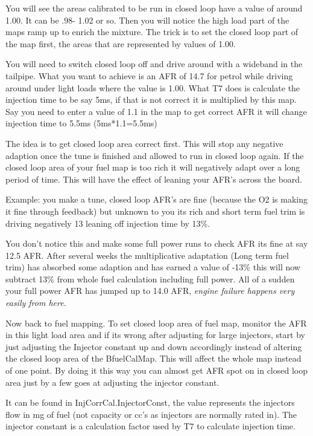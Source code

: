 \documentclass[11pt,a4paper]{book}
\begin{document}
You will see the areas calibrated to be run in closed loop have a value of around 1.00. It can be .98-
1.02 or so. Then you will notice the high load part of the maps ramp up to enrich the mixture.
The trick is to set the closed loop part of the map first, the areas that are represented by values of
1.00.

You will need to switch closed loop off and drive around with a wideband in the tailpipe.
What you want to achieve is an AFR of 14.7 for petrol while driving around under light loads where
the value is 1.00. What T7 does is calculate the injection time to be say 5ms, if that is not correct it is
multiplied by this map. Say you need to enter a value of 1.1 in the map to get correct AFR it will
change injection time to 5.5ms (5ms*1.1=5.5ms)

The idea is to get closed loop area correct first. This will stop any negative adaption once the tune is
finished and allowed to run in closed loop again. If the closed loop area of your fuel map is too rich it
will negatively adapt over a long period of time. This will have the effect of leaning your AFR's across
the board.

Example: you make a tune, closed loop AFR's are fine (because the O2 is making it fine through
feedback) but unknown to you its rich and short term fuel trim is driving negatively 13%
leaning off injection time by 13\%.

You don’t notice this and make some full power runs to check AFR its fine at say 12.5 AFR.
After several weeks the multiplicative adaptation (Long term fuel trim) has absorbed some adaption
and has earned a value of -13\% this will now subtract 13\% from whole fuel calculation including full
power. All of a sudden your full power AFR has jumped up to 14.0 AFR, \emph{engine failure happens
very easily from here}.

Now back to fuel mapping. To set closed loop area of fuel map, monitor the AFR in this light load area
and if its wrong after adjusting for large injectors, start by just adjusting the Injector constant up and
down accordingly instead of altering the closed loop area of the BfuelCalMap. This will affect the
whole map instead of one point. By doing it this way you can almost get AFR spot on in closed loop
area just by a few goes at adjusting the injector constant.

It can be found in InjCorrCal.InjectorConst, the value represents the injectors flow in mg of fuel (not
capacity or cc's as injectors are normally rated in). The injector constant is a calculation factor used by
T7 to calculate injection time.
\end{document}
